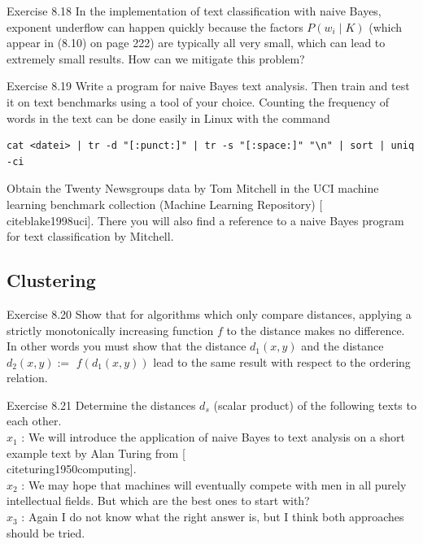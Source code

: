\documentclass[10pt]{book}
\begin{document}
Exercise 8.18 In the implementation of text classification with naive Bayes, exponent underflow can happen quickly because the factors $P\left(w_{i} \mid K\right)$ (which appear in (8.10) on page 222) are typically all very small, which can lead to extremely small results. How can we mitigate this problem?

Exercise 8.19 Write a program for naive Bayes text analysis. Then train and test it on text benchmarks using a tool of your choice. Counting the frequency of words in the text can be done easily in Linux with the command

\begin{verbatim}
cat <datei> | tr -d "[:punct:]" | tr -s "[:space:]" "\n" | sort | uniq -ci
\end{verbatim}

Obtain the Twenty Newsgroups data by Tom Mitchell in the UCI machine learning benchmark collection (Machine Learning Repository) [\\cite{blake1998uci}]. There you will also find a reference to a naive Bayes program for text classification by Mitchell.

\subsection{Clustering}
Exercise 8.20 Show that for algorithms which only compare distances, applying a strictly monotonically increasing function $f$ to the distance makes no difference. In other words you must show that the distance $d_{1}(x, y)$ and the distance $d_{2}(x, y):=$ $f\left(d_{1}(x, y)\right)$ lead to the same result with respect to the ordering relation.

Exercise 8.21 Determine the distances $d_{s}$ (scalar product) of the following texts to each other.\\

$x_{1}$ : We will introduce the application of naive Bayes to text analysis on a short example text by Alan Turing from [\\cite{turing1950computing}].\\
$x_{2}$ : We may hope that machines will eventually compete with men in all purely intellectual fields. But which are the best ones to start with?\\
$x_{3}$ : Again I do not know what the right answer is, but I think both approaches should be tried.
\end{document}

